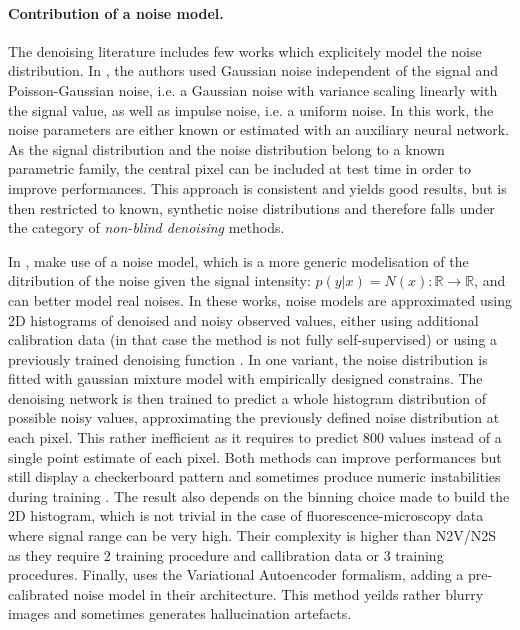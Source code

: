 \documentclass{article}
\begin{document}
\paragraph{Contribution of a noise model.}
The denoising literature includes few works which explicitely model the noise distribution. In \cite{laine2019high}, the authors used Gaussian noise independent of the signal and Poisson-Gaussian noise, i.e. a Gaussian noise with variance scaling linearly with the signal value, as well as impulse noise, i.e. a uniform noise.
In this work, the noise parameters are either known or estimated with an auxiliary neural network.
As the signal distribution and the noise distribution belong to a known parametric family, the central pixel can be included at test time in order to improve performances.
This approach is consistent and yields good results, but is then restricted to known, synthetic noise distributions and therefore falls under the category of \textit{non-blind denoising} methods.

In \cite{krull2019probabilistic,prakash2020fully,2020DivNoising}, make use of a noise model, which is a more generic modelisation of the ditribution of the noise given the signal intensity: $p(y|x) = N(x): \mathbb{R} \to \mathbb{R}$, and can better model real noises.
In these works, noise models are approximated using 2D histograms of denoised and noisy observed values, either using additional calibration data \cite{krull2019probabilistic} (in that case the method is not fully self-supervised) or using a previously trained denoising function \cite{prakash2020fully}. In one variant, the noise distribution is fitted with gaussian mixture model with empirically designed constrains.
The denoising network is then trained to predict a whole histogram distribution of possible noisy values, approximating the previously defined noise distribution at each pixel.
This rather inefficient as it requires to predict $800$ values instead of a single point estimate of each pixel.
Both methods can improve performances but still display a checkerboard pattern and sometimes produce numeric instabilities during training \cite{goncharova2020}.
The result also depends on the binning choice made to build the 2D histogram, which is not trivial in the case of fluorescence-microscopy data where signal range can be very high.
Their complexity is higher than N2V/N2S as they require $2$ training procedure and callibration data or $3$ training procedures.
Finally, \cite{2020DivNoising} uses the Variational Autoencoder formalism, adding a pre-calibrated noise model in their architecture.
This method yeilds rather blurry images and sometimes generates hallucination artefacts.
\end{document}
